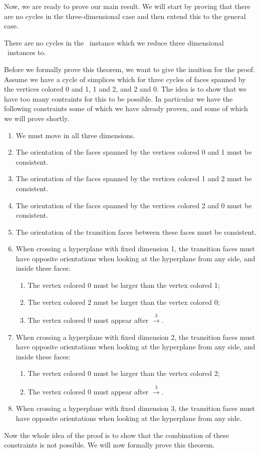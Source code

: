Now, we are ready to prove our main result. We will start by proving that there are no cycles in the three-dimensional case and then extend this to the general case.

\begin{theorem}\label{thm:no_cycles_in_three_dimensional_tarskistar}
	There are no cycles in the \EndOfLine\ instance which we reduce three dimensional \Tarskistar\ instances to.
\end{theorem}

Before we formally prove this theorem, we want to give the inuition for the proof. Assume we have a cycle of simplices which for three cycles of faces spanned by the vertices colored 0 and 1, 1 and 2, and 2 and 0. The idea is to show that we have too many contraints for this to be possible. In particular we have the following constraints some of which we have already proven, and some of which we will prove shortly.
\begin{enumerate}
	\item We must move in all three dimensions.
	\item The orientation of the faces spanned by the vertices colored 0 and 1 must be consistent.
	\item The orientation of the faces spanned by the vertices colored 1 and 2 must be consistent.
	\item The orientation of the faces spanned by the vertices colored 2 and 0 must be consistent.
	\item The orientation of the transition faces between these faces must be consistent.
	\item When crossing a hyperplane with fixed dimension 1, the transition faces must have opposite orientations when looking at the hyperplane from any side, and inside these faces:
	      \begin{enumerate}
		      \item The vertex colored 0 must be larger than the vertex colored 1;
		      \item The vertex colored 2 must be larger than the vertex colored 0;
		      \item The vertex colored 0 must appear after $\xrightarrow{3}$.
	      \end{enumerate}
	\item When crossing a hyperplane with fixed dimension 2, the transition faces must have opposite orientations when looking at the hyperplane from any side, and inside these faces:
	      \begin{enumerate}
		      \item The vertex colored 0 must be larger than the vertex colored 2;
		      \item The vertex colored 0 must appear after $\xrightarrow{3}$.
	      \end{enumerate}
	\item When crossing a hyperplane with fixed dimension 3, the transition faces must have opposite orientations when looking at the hyperplane from any side.
\end{enumerate}
Now the whole idea of the proof is to show that the combination of these constraints is not possible. We will now formally prove this theorem.

